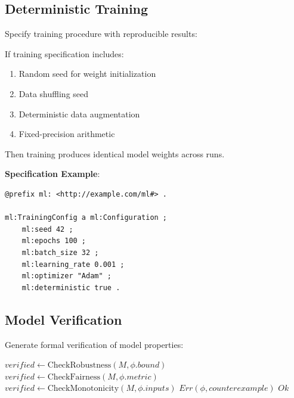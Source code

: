 \subsection{Deterministic Training}

Specify training procedure with reproducible results:

\begin{theorem}
    If training specification includes:
    \begin{enumerate}
        \item Random seed for weight initialization
        \item Data shuffling seed
        \item Deterministic data augmentation
        \item Fixed-precision arithmetic
    \end{enumerate}
    Then training produces identical model weights across runs.
\end{theorem}

\textbf{Specification Example}:

\begin{verbatim}
@prefix ml: <http://example.com/ml#> .

ml:TrainingConfig a ml:Configuration ;
    ml:seed 42 ;
    ml:epochs 100 ;
    ml:batch_size 32 ;
    ml:learning_rate 0.001 ;
    ml:optimizer "Adam" ;
    ml:deterministic true .
\end{verbatim}

\subsection{Model Verification}

Generate formal verification of model properties:

\begin{algorithm}
\caption{Model Property Verification}
\begin{algorithmic}[1]
            \State $verified \gets \text{CheckRobustness}(M, \phi.bound)$
            \State $verified \gets \text{CheckFairness}(M, \phi.metric)$
            \State $verified \gets \text{CheckMonotonicity}(M, \phi.inputs)$
        \EndIf
            \State \Return $Err(\phi, counterexample)$
        \EndIf
    \EndFor
    \State \Return $Ok$
\EndProcedure
\end{algorithmic}
\end{algorithm}

